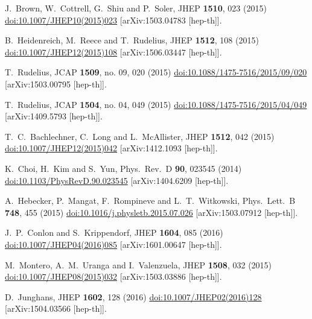 \documentclass[12pt]{article}
\begin{document}
\begin{thebibliography}{99}
  J.~Brown, W.~Cottrell, G.~Shiu and P.~Soler,
  JHEP {\bf 1510}, 023 (2015)
  \href{https://dx.doi.org/10.1007/JHEP10(2015)023}{doi:10.1007/JHEP10(2015)023}
  [arXiv:1503.04783 [hep-th]].

  B.~Heidenreich, M.~Reece and T.~Rudelius,
  JHEP {\bf 1512}, 108 (2015)
  \href{https://dx.doi.org/10.1007/JHEP12(2015)108}{doi:10.1007/JHEP12(2015)108}
  [arXiv:1506.03447 [hep-th]].

  T.~Rudelius,
  JCAP {\bf 1509}, no. 09, 020 (2015)
  \href{https://dx.doi.org/10.1088/1475-7516/2015/09/020}{doi:10.1088/1475-7516/2015/09/020}
  [arXiv:1503.00795 [hep-th]].

  T.~Rudelius,
  JCAP {\bf 1504}, no. 04, 049 (2015)
  \href{https://dx.doi.org/10.1088/1475-7516/2015/04/049}{doi:10.1088/1475-7516/2015/04/049}
  [arXiv:1409.5793 [hep-th]].

  T.~C.~Bachlechner, C.~Long and L.~McAllister,
  JHEP {\bf 1512}, 042 (2015)
  \href{https://dx.doi.org/10.1007/JHEP12(2015)042}{doi:10.1007/JHEP12(2015)042}
  [arXiv:1412.1093 [hep-th]].

  K.~Choi, H.~Kim and S.~Yun,
  Phys.\ Rev.\ D {\bf 90}, 023545 (2014)
  \href{https://dx.doi.org/10.1103/PhysRevD.90.023545}{doi:10.1103/PhysRevD.90.023545}
  [arXiv:1404.6209 [hep-th]].

  A.~Hebecker, P.~Mangat, F.~Rompineve and L.~T.~Witkowski,
  Phys.\ Lett.\ B {\bf 748}, 455 (2015)
  \href{https://dx.doi.org/10.1016/j.physletb.2015.07.026}{doi:10.1016/j.physletb.2015.07.026}
  [arXiv:1503.07912 [hep-th]].

  J.~P.~Conlon and S.~Krippendorf,
  JHEP {\bf 1604}, 085 (2016)
  \href{https://dx.doi.org/10.1007/JHEP04(2016)085}{doi:10.1007/JHEP04(2016)085}
  [arXiv:1601.00647 [hep-th]].

  M.~Montero, A.~M.~Uranga and I.~Valenzuela,
  JHEP {\bf 1508}, 032 (2015)
  \href{https://dx.doi.org/10.1007/JHEP08(2015)032}{doi:10.1007/JHEP08(2015)032}
  [arXiv:1503.03886 [hep-th]].

  D.~Junghans,
  JHEP {\bf 1602}, 128 (2016)
  \href{https://dx.doi.org/10.1007/JHEP02(2016)128}{doi:10.1007/JHEP02(2016)128}
  [arXiv:1504.03566 [hep-th]].

\end{thebibliography}
\end{document}

